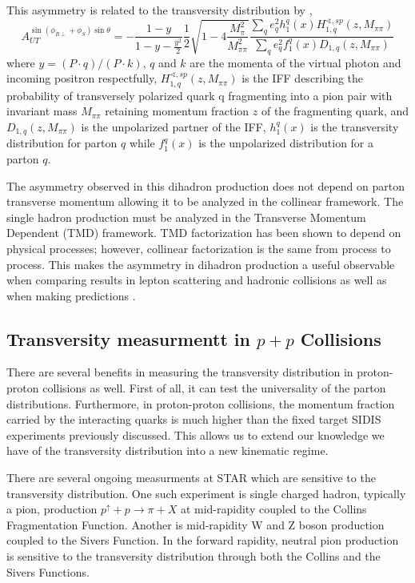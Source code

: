 \documentclass[abstract = on,listof=totoc, bibliography=totoc]{scrreprt}
\begin{document}
This asymmetry is related to the transversity distribution by \cite{hermesRes},
 \begin{equation}
A_{UT}^{\sin(\phi_{R\perp}+\phi_S)\sin\theta} = - \frac{1-y}{1-y-\frac{y^2}{2}}\frac{1}{2}\sqrt{1-4\frac{M_\pi^2}{M_{\pi\pi}^2}}\frac{\sum\limits_q e_q^2h_1^q(x)H_{1,q}^{\sphericalangle,sp}(z,M_{\pi\pi})}{\sum\limits_q e_q^2f_1^q(x)D_{1,q}(z,M_{\pi\pi})}
\end{equation}
where $y = (P\cdot q)/(P\cdot k)$, $q$ and $k$ are the momenta of the virtual photon and incoming positron respectfully, $H_{1,q}^{\sphericalangle,sp}(z,M_{\pi\pi})$ is the IFF describing the probability of transversely polarized quark q fragmenting into a pion pair with invariant mass $M_{\pi\pi}$ retaining momentum fraction $z$ of the fragmenting quark, and $D_{1,q}(z,M_{\pi\pi})$ is the unpolarized partner of the IFF, $h_1^q(x)$ is the transversity distribution for parton $q$ while $f_1^q(x)$ is the unpolarized distribution for a parton $q$.

The asymmetry observed in this dihadron production does not depend on parton transverse momentum allowing it to be analyzed in the collinear framework. The single hadron production must be analyzed in the Transverse Momentum Dependent (TMD) framework. TMD factorization has been shown to depend on physical processes; however, collinear factorization is the same from process to process. This makes the asymmetry in dihadron production a useful observable when comparing results in lepton scattering and hadronic collisions as well as when making predictions \cite{univTrans}.  
  

\subsection{Transversity measurmentt in $p+p$ Collisions}
There are several benefits in measuring the transversity distribution in proton-proton collisions as well. First of all, it can test the universality of the parton distributions. Furthermore, in proton-proton collisions, the momentum fraction carried by the interacting quarks is much higher than the fixed target SIDIS experiments previously discussed. This allows us to extend our knowledge we have of the transversity distribution into a new kinematic regime. 

There are several ongoing measurments at STAR which are sensitive to the transversity distribution. One such experiment is single charged hadron, typically a pion, production $p^\uparrow + p \rightarrow \pi + X$ at mid-rapidity coupled to the Collins Fragmentation Function. Another is mid-rapidity W and Z boson production coupled to the Sivers Function. In the forward rapidity, neutral pion production is sensitive to the transversity distribution through both the Collins and the Sivers Functions. 
\end{document}
